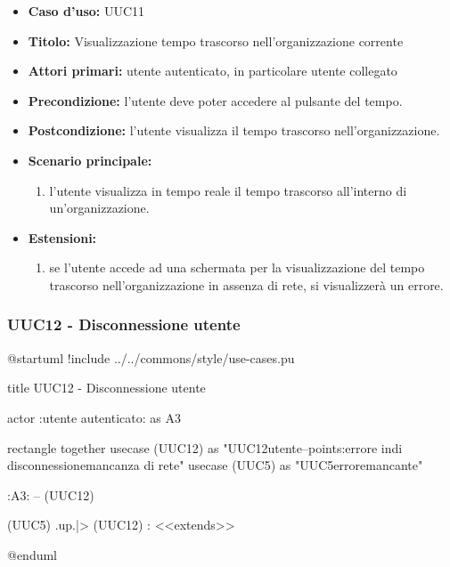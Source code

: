\documentclass[casi-duso]{subfiles}
\begin{document}
\begin{itemize}
  \item \textbf{Caso d’uso:} UUC11
  \item \textbf{Titolo:} Visualizzazione tempo trascorso nell'organizzazione corrente
  \item \textbf{Attori primari:} utente autenticato, in particolare utente collegato
  \item \textbf{Precondizione:} l'utente deve poter accedere al pulsante del tempo.
  \item \textbf{Postcondizione:} l'utente visualizza il tempo trascorso nell'organizzazione.
  \item \textbf{Scenario principale:}
        \begin{enumerate}
          \item l'utente visualizza in tempo reale il tempo trascorso all'interno di un'organizzazione.
        \end{enumerate}
  \item \textbf{Estensioni:}
        \begin{enumerate}
          \item se l'utente accede ad una schermata per la visualizzazione del tempo trascorso nell'organizzazione in assenza di rete, si visualizzerà un errore.
        \end{enumerate}
\end{itemize}

\subsubsection{UUC12 - Disconnessione utente}%
\label{subsub:UUC12utente}

\begin{plantuml}
@startuml
!include ../../commons/style/use-cases.pu

title UUC12 - Disconnessione utente

actor :utente autenticato: as A3

rectangle {
  together {
    usecase (UUC12) as "UUC12\nDisconnessione utente\n--\nExtension points:\nVisualizzazione errore in\ncaso di disconnessione\nin mancanza di rete"
    usecase (UUC5) as "UUC5\nVisualizzazione errore\nrete mancante"
  }
}

:A3: -- (UUC12)

(UUC5) .up.|> (UUC12) : <<extends>>

@enduml
\end{plantuml}
\end{document}
